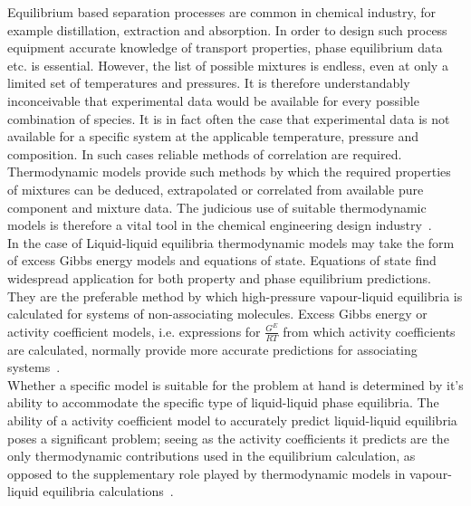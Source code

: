 
Equilibrium based separation processes are common in chemical industry, for example distillation, extraction and absorption. In order to design such process equipment accurate knowledge of transport properties, phase equilibrium data etc. is essential. However, the list of possible mixtures is endless, even at only a limited set of temperatures and pressures. It is therefore understandably inconceivable that experimental data would be available for every possible combination of species. It is in fact often the case that experimental data is not available for a specific system at the applicable temperature, pressure and composition. In such cases reliable methods of correlation are required. Thermodynamic models provide such methods by which the required properties of mixtures can be deduced, extrapolated or correlated from available pure component and mixture data. The judicious use of suitable thermodynamic models is therefore a vital tool in the chemical engineering design industry~\cite{SmithNessAbbott, GasLiquidProperties, ThermophysicalProperties}.\\

In the case of Liquid-liquid equilibria thermodynamic models may take the form of excess Gibbs energy models and equations of state. Equations of state find widespread application for both property and phase equilibrium predictions. They are the preferable method by which high-pressure vapour-liquid equilibria is calculated for systems of non-associating molecules. Excess Gibbs energy or activity coefficient models, i.e. expressions for $\frac{G^{E}}{RT}$ from which activity coefficients are calculated, normally provide more accurate predictions for associating systems~\cite{ThermophysicalProperties}.\\

Whether a specific model is suitable for the problem at hand is determined by it's ability to accommodate the specific type of liquid-liquid phase equilibria. The ability of a activity coefficient model to accurately predict liquid-liquid equilibria poses a significant problem; seeing as the activity coefficients it predicts are the only thermodynamic contributions used in the equilibrium calculation, as opposed to the supplementary role played by thermodynamic models in vapour-liquid equilibria calculations~\cite{SmithNessAbbott, GasLiquidProperties}.\\


